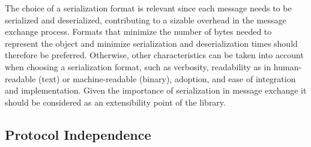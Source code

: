\documentclass[10pt, conference, a4paper]{IEEEtran}
\begin{document}
The choice of a serialization format is relevant since each message needs to be serialized and deserialized, contributing to a sizable overhead in the message exchange process. 
Formats that minimize the number of bytes needed to represent the object and minimize serialization and deserialization times should therefore be preferred.
Otherwise, other characteristics can be taken into account when choosing a serialization format, 
such as verbosity, readability as in human-readable (text) or machine-readable (binary), adoption, and ease of integration and implementation. 
Given the importance of serialization in message exchange it should be considered as an extensibility point of the library.

\subsection{Protocol Independence}



\setlength\bibitemsep{\baselineskip}
\printbibliography
\end{document}
